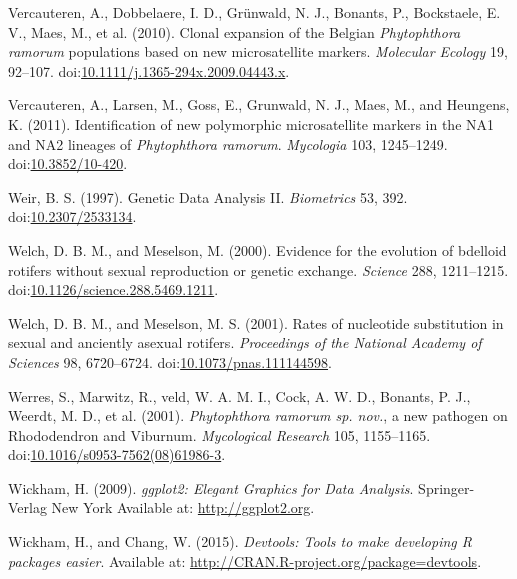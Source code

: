 \documentclass[double,12pt]{beavtex}
\begin{document}
  \hypertarget{ref-vercauteren2010clonal}{}
  Vercauteren, A., Dobbelaere, I. D., Grünwald, N. J., Bonants, P.,
  Bockstaele, E. V., Maes, M., et al. (2010). Clonal expansion of the
  Belgian \emph{Phytophthora ramorum} populations based on new
  microsatellite markers. \emph{Molecular Ecology} 19, 92--107.
  doi:\href{https://doi.org/10.1111/j.1365-294x.2009.04443.x}{10.1111/j.1365-294x.2009.04443.x}.
  
  \hypertarget{ref-vercauteren2011identification}{}
  Vercauteren, A., Larsen, M., Goss, E., Grunwald, N. J., Maes, M., and
  Heungens, K. (2011). Identification of new polymorphic microsatellite
  markers in the NA1 and NA2 lineages of \emph{Phytophthora ramorum}.
  \emph{Mycologia} 103, 1245--1249.
  doi:\href{https://doi.org/10.3852/10-420}{10.3852/10-420}.
  
  \hypertarget{ref-Weir_1997}{}
  Weir, B. S. (1997). Genetic Data Analysis II. \emph{Biometrics} 53, 392.
  doi:\href{https://doi.org/10.2307/2533134}{10.2307/2533134}.
  
  \hypertarget{ref-welch2000evidence}{}
  Welch, D. B. M., and Meselson, M. (2000). Evidence for the evolution of
  bdelloid rotifers without sexual reproduction or genetic exchange.
  \emph{Science} 288, 1211--1215.
  doi:\href{https://doi.org/10.1126/science.288.5469.1211}{10.1126/science.288.5469.1211}.
  
  \hypertarget{ref-welch2001rates}{}
  Welch, D. B. M., and Meselson, M. S. (2001). Rates of nucleotide
  substitution in sexual and anciently asexual rotifers. \emph{Proceedings
  of the National Academy of Sciences} 98, 6720--6724.
  doi:\href{https://doi.org/10.1073/pnas.111144598}{10.1073/pnas.111144598}.
  
  \hypertarget{ref-werres2001phytophthora}{}
  Werres, S., Marwitz, R., veld, W. A. M. I., Cock, A. W. D., Bonants, P.
  J., Weerdt, M. D., et al. (2001). \emph{Phytophthora ramorum sp. nov.},
  a new pathogen on Rhododendron and Viburnum. \emph{Mycological Research}
  105, 1155--1165.
  doi:\href{https://doi.org/10.1016/s0953-7562(08)61986-3}{10.1016/s0953-7562(08)61986-3}.
  
  \hypertarget{ref-wickham2009ggplot2}{}
  Wickham, H. (2009). \emph{ggplot2: Elegant Graphics for Data Analysis}.
  Springer-Verlag New York Available at: \url{http://ggplot2.org}.
  
  \hypertarget{ref-wickham2015devtools}{}
  Wickham, H., and Chang, W. (2015). \emph{Devtools: Tools to make
  developing R packages easier}. Available at:
  \url{http://CRAN.R-project.org/package=devtools}.
  
\end{document}
